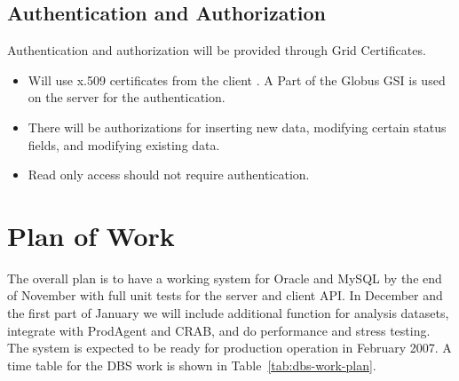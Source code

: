 \documentclass{cmspaper}
\begin{document}
   \subsection{Authentication and Authorization}
Authentication and authorization will be provided through Grid Certificates.
\begin{itemize}
      \item Will use x.509 certificates from the client . A Part of the Globus GSI is used on the server for the authentication.
      \item There will be authorizations for inserting new data, modifying certain status fields, and modifying existing data.
      \item Read only access should not require authentication.
\end{itemize}
\section{Plan of Work}
The overall plan is to have a working system for Oracle and MySQL by the end of November with full unit tests for the server and client API. In December and the first  part of January we will include additional function for analysis datasets, integrate with ProdAgent and CRAB,  and do performance and stress testing. The system  is expected to be ready for production operation in February 2007.
A time table for the DBS work is shown in Table~\ref{tab:dbs-work-plan}.
\end{document}
